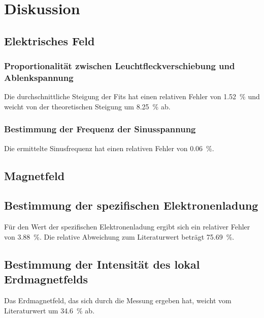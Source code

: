 \section{Diskussion}
\label{sec:Diskussion}

\subsection{Elektrisches Feld}


\subsubsection{Proportionalität zwischen Leuchtfleckverschiebung und Ablenkspannung}

Die durchschnittliche Steigung der Fits hat einen relativen Fehler von \SI{1.52}{\percent} und weicht von der theoretischen Steigung um \SI{8.25}{\percent} ab. 

\subsubsection{Bestimmung der Frequenz der Sinusspannung}

Die ermittelte Sinusfrequenz hat einen relativen Fehler von \SI{0.06}{\percent}.

\subsection{Magnetfeld}


\subsection{Bestimmung der spezifischen Elektronenladung}

Für den Wert der spezifischen Elektronenladung ergibt sich ein relativer Fehler von \SI{3.88}{\percent}. Die relative Abweichung zum Literaturwert beträgt \SI{75.69}{\percent}. 

\subsection{Bestimmung der Intensität des lokal Erdmagnetfelds}

Das Erdmagnetfeld, das sich durch die Messung ergeben hat, weicht vom Literaturwert um \SI{34.6}{\percent} ab. 
